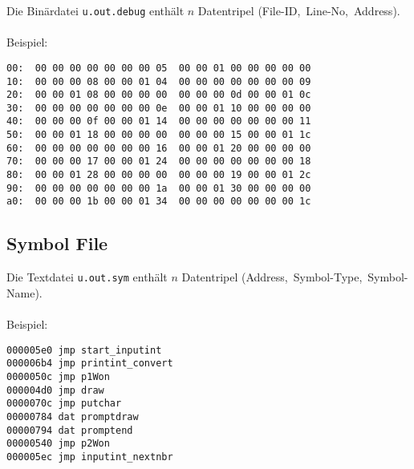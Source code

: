 \begin{frame}[fragile]{\insertsubsection}
    Die Binärdatei \texttt{u.out.debug} enthält $n$ Datentripel (File-ID,~Line-No,~Address).
    \\~\\
    Beispiel:
\begin{verbatim}
00:  00 00 00 00 00 00 00 05  00 00 01 00 00 00 00 00
10:  00 00 00 08 00 00 01 04  00 00 00 00 00 00 00 09
20:  00 00 01 08 00 00 00 00  00 00 00 0d 00 00 01 0c
30:  00 00 00 00 00 00 00 0e  00 00 01 10 00 00 00 00
40:  00 00 00 0f 00 00 01 14  00 00 00 00 00 00 00 11
50:  00 00 01 18 00 00 00 00  00 00 00 15 00 00 01 1c
60:  00 00 00 00 00 00 00 16  00 00 01 20 00 00 00 00
70:  00 00 00 17 00 00 01 24  00 00 00 00 00 00 00 18
80:  00 00 01 28 00 00 00 00  00 00 00 19 00 00 01 2c
90:  00 00 00 00 00 00 00 1a  00 00 01 30 00 00 00 00
a0:  00 00 00 1b 00 00 01 34  00 00 00 00 00 00 00 1c
\end{verbatim}
\end{frame}

\subsection{Symbol File}

\begin{frame}[fragile]{\insertsubsection}
    Die Textdatei \texttt{u.out.sym} enthält $n$ Datentripel (Address,~Symbol-Type,~Symbol-Name).
    \\~\\
    Beispiel:
\begin{verbatim}
000005e0 jmp start_inputint
000006b4 jmp printint_convert
0000050c jmp p1Won
000004d0 jmp draw
0000070c jmp putchar
00000784 dat promptdraw
00000794 dat promptend
00000540 jmp p2Won
000005ec jmp inputint_nextnbr
\end{verbatim}
\end{frame}
